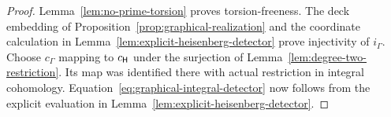 \begin{proof}
Lemma~\ref{lem:no-prime-torsion} proves torsion-freeness.
The deck embedding of Proposition~\ref{prop:graphical-realization}
and the coordinate calculation in
Lemma~\ref{lem:explicit-heisenberg-detector} prove injectivity of
$i_\Gamma$.  Choose $c_\Gamma$ mapping to $c_{\mathsf H}$ under the
surjection of Lemma~\ref{lem:degree-two-restriction}.  Its map
was identified there with actual restriction in integral
cohomology.  Equation~\eqref{eq:graphical-integral-detector}
now follows from the explicit evaluation in
Lemma~\ref{lem:explicit-heisenberg-detector}.
\end{proof}

